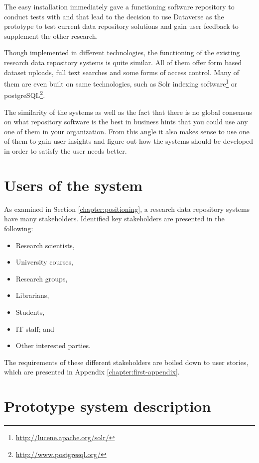 The easy installation immediately gave a functioning software repository to
conduct tests with and that lead to the decision to use Dataverse as the
prototype to test current data repository solutions and gain user feedback to
supplement the other research.

Though implemented in different technologies, the functioning of the existing
research data repository systems is quite similar. All of them offer form based
dataset uploads, full text searches and some forms of access control. Many of
them are even built on same technologies, such as Solr indexing
software\footnote{\label{solr}\url{http://lucene.apache.org/solr/}} or
postgreSQL\footnote{\label{postgre}\url{http://www.postgresql.org/}}.

The similarity of the systems as well as the fact that there is no global
consensus on what repository software is the best in business hints that you
could use any one of them in your organization. From this angle it also makes
sense to use one of them to gain user insights and figure out how the systems
should be developed in order to satisfy the user needs better.

\section{Users of the system}
\label{sec:users}

As examined in Section \ref{chapter:positioning}, a research data repository
systems have many stakeholders. Identified key stakeholders are presented in
the following:

\begin{itemize}
    \item Research scientists,
    \item University courses,
    \item Research groups,
    \item Librarians,
    \item Students,
    \item IT staff; and
    \item Other interested parties.
\end{itemize}

The requirements of these different stakeholders are boiled down to user
stories, which are presented in Appendix \ref{chapter:first-appendix}.

\section{Prototype system description}
\label{sec:system_description}

